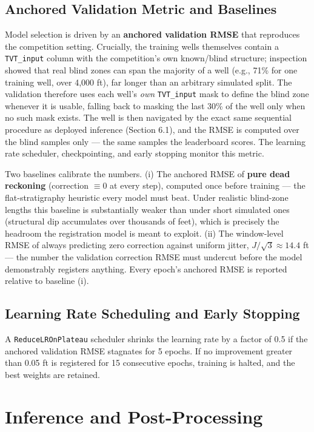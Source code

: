 \documentclass[12pt, a4paper]{article}
\begin{document}
    \subsection{Anchored Validation Metric and Baselines}
    Model selection is driven by an \textbf{anchored validation RMSE} that reproduces the competition setting. Crucially, the training wells themselves contain a \texttt{TVT\_input} column with the competition's own known/blind structure; inspection showed that real blind zones can span the majority of a well (e.g., 71\% for one training well, over 4{,}000 ft), far longer than an arbitrary simulated split. The validation therefore uses each well's \textit{own} \texttt{TVT\_input} mask to define the blind zone whenever it is usable, falling back to masking the last 30\% of the well only when no such mask exists. The well is then navigated by the exact same sequential procedure as deployed inference (Section 6.1), and the RMSE is computed over the blind samples only --- the same samples the leaderboard scores. The learning rate scheduler, checkpointing, and early stopping monitor this metric.

    Two baselines calibrate the numbers. (i) The anchored RMSE of \textbf{pure dead reckoning} (correction $\equiv 0$ at every step), computed once before training --- the flat-stratigraphy heuristic every model must beat. Under realistic blind-zone lengths this baseline is substantially weaker than under short simulated ones (structural dip accumulates over thousands of feet), which is precisely the headroom the registration model is meant to exploit. (ii) The window-level RMSE of always predicting zero correction against uniform jitter, $J/\sqrt{3} \approx 14.4$ ft --- the number the validation correction RMSE must undercut before the model demonstrably registers anything. Every epoch's anchored RMSE is reported relative to baseline (i).

    \subsection{Learning Rate Scheduling and Early Stopping}
    A \texttt{ReduceLROnPlateau} scheduler shrinks the learning rate by a factor of 0.5 if the anchored validation RMSE stagnates for 5 epochs. If no improvement greater than 0.05 ft is registered for 15 consecutive epochs, training is halted, and the best weights are retained.

    \section{Inference and Post-Processing}
\end{document}
